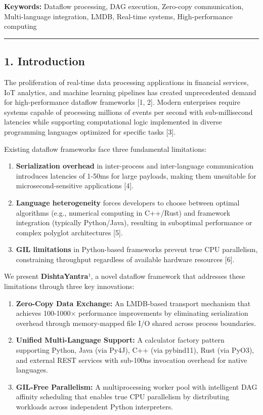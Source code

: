 \documentclass[
]{article}
\begin{document}
\textbf{Keywords:} Dataflow processing, DAG execution, Zero-copy
communication, Multi-language integration, LMDB, Real-time systems,
High-performance computing

\begin{center}\rule{0.5\linewidth}{0.5pt}\end{center}

\hypertarget{introduction}{%
\subsection{1. Introduction}\label{introduction}}

The proliferation of real-time data processing applications in financial
services, IoT analytics, and machine learning pipelines has created
unprecedented demand for high-performance dataflow frameworks {[}1,
2{]}. Modern enterprises require systems capable of processing millions
of events per second with sub-millisecond latencies while supporting
computational logic implemented in diverse programming languages
optimized for specific tasks {[}3{]}.

Existing dataflow frameworks face three fundamental limitations:

\begin{enumerate}
\def\labelenumi{\arabic{enumi}.}
\item
  \textbf{Serialization overhead} in inter-process and inter-language
  communication introduces latencies of 1-50ms for large payloads,
  making them unsuitable for microsecond-sensitive applications {[}4{]}.
\item
  \textbf{Language heterogeneity} forces developers to choose between
  optimal algorithms (e.g., numerical computing in C++/Rust) and
  framework integration (typically Python/Java), resulting in suboptimal
  performance or complex polyglot architectures {[}5{]}.
\item
  \textbf{GIL limitations} in Python-based frameworks prevent true CPU
  parallelism, constraining throughput regardless of available hardware
  resources {[}6{]}.
\end{enumerate}

We present \textbf{DishtaYantra}¹, a novel dataflow framework that
addresses these limitations through three key innovations:

\begin{enumerate}
\def\labelenumi{\arabic{enumi}.}
\item
  \textbf{Zero-Copy Data Exchange:} An LMDB-based transport mechanism
  that achieves 100-1000× performance improvements by eliminating
  serialization overhead through memory-mapped file I/O shared across
  process boundaries.
\item
  \textbf{Unified Multi-Language Support:} A calculator factory pattern
  supporting Python, Java (via Py4J), C++ (via pybind11), Rust (via
  PyO3), and external REST services with sub-100ns invocation overhead
  for native languages.
\item
  \textbf{GIL-Free Parallelism:} A multiprocessing worker pool with
  intelligent DAG affinity scheduling that enables true CPU parallelism
  by distributing workloads across independent Python interpreters.
\end{enumerate}
\end{document}
